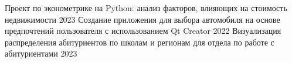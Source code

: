 


\begin{cvhonors}

  \cvhonor
    {Проект по эконометрике на Python: анализ факторов, влияющих на стоимость недвижимости} %
    {} %
    {} %
    {2023} %
  \cvhonor
    {Создание приложения для выбора автомобиля на основе предпочтений пользователя с использованием Qt Creator} %
    {} %
    {} %
    {2022} %
  \cvhonor
    {Визуализация распределения абитуриентов по школам и регионам для отдела по работе с абитуриентами} %
    {} %
    {} %
    {2023} %

\end{cvhonors}
